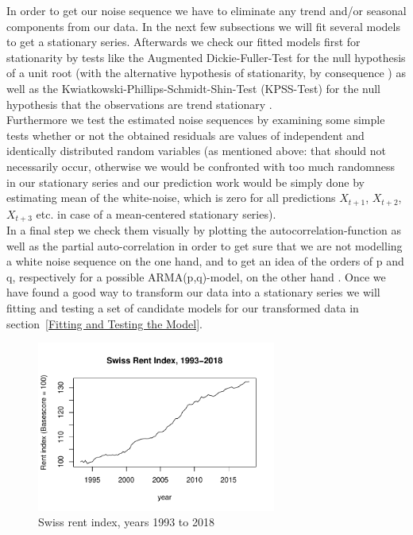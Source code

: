 \documentclass[11pt,a4paper]{article}
\begin{document}
In order to get our noise sequence we have to eliminate any trend and/or seasonal components from our data. In the next few subsections we will fit several models to get a stationary series. Afterwards we check our fitted models first for stationarity by tests like the Augmented Dickie-Fuller-Test for the null hypothesis of a unit root (with the alternative hypothesis of stationarity, by consequence \citep{adf}) as well as the Kwiatkowski-Phillips-Schmidt-Shin-Test (KPSS-Test) for the null hypothesis that the observations are trend stationary \citep{kpss92}. \\
Furthermore we test the estimated noise sequences by examining some simple tests whether or not the obtained residuals are values of independent and identically distributed random variables (as mentioned above: that should not necessarily occur, otherwise we would be confronted with too much randomness in our stationary series and our prediction work would be simply done by estimating mean of the white-noise, which is zero for all predictions $X_{t+1}$, $X_{t+2}$, $X_{t+3}$ etc. in case of a mean-centered stationary series). \\
In a final step we check them visually by plotting the autocorrelation-function as well as the partial auto-correlation in order to get sure that we are not modelling a white noise sequence on the one hand, and to get an idea of the orders of p and q, respectively for a possible ARMA(p,q)-model, on the other hand \cite[pp.~83--110]{bd02}.
Once we have found a good way to transform our data into a stationary series we will fitting and testing a set of candidate models for our transformed data in section~\ref{Fitting and Testing the Model}.
\\
\begin{figure}[!ht]
\centering
\includegraphics[angle=0,
width=0.7\textwidth]{indiceloyers_timeseries}
\caption{Swiss rent index, years 1993 to 2018\label{fig:indiceloyers_timeseries}}
\end{figure}
 
\end{document}
